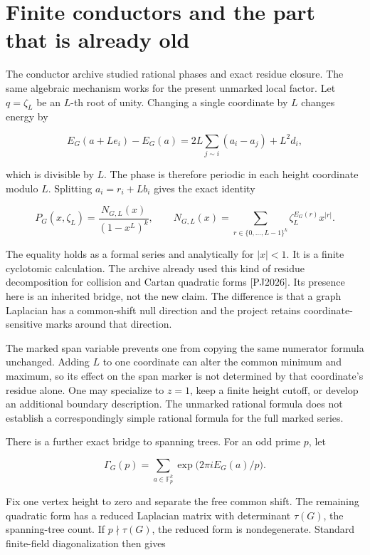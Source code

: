 \documentclass[
  11pt,
  a4paper,
]{report}
\begin{document}
\hypertarget{finite-conductors-and-the-part-that-is-already-old}{%
\section{Finite conductors and the part that is already
old}\label{finite-conductors-and-the-part-that-is-already-old}}

The conductor archive studied rational phases and exact residue closure.
The same algebraic mechanism works for the present unmarked local
factor. Let \(q=\zeta_L\) be an \(L\)-th root of unity. Changing a
single coordinate by \(L\) changes energy by

\[
E_G(a+Le_i)-E_G(a)
=2L\sum_{j\sim i}(a_i-a_j)+L^2d_i,
\]

which is divisible by \(L\). The phase is therefore periodic in each
height coordinate modulo \(L\). Splitting \(a_i=r_i+Lb_i\) gives the
exact identity

\[
P_G(x,\zeta_L)=\frac{N_{G,L}(x)}{(1-x^L)^k},
\qquad
N_{G,L}(x)=\sum_{r\in\{0,\ldots,L-1\}^k}
\zeta_L^{E_G(r)}x^{|r|}.
\tag{SNG-I021}
\]

The equality holds as a formal series and analytically for \(|x|<1\). It
is a finite cyclotomic calculation. The archive already used this kind
of residue decomposition for collision and Cartan quadratic forms
{[}PJ2026{]}. Its presence here is an inherited bridge, not the new
claim. The difference is that a graph Laplacian has a common-shift null
direction and the project retains coordinate-sensitive marks around that
direction.

The marked span variable prevents one from copying the same numerator
formula unchanged. Adding \(L\) to one coordinate can alter the common
minimum and maximum, so its effect on the span marker is not determined
by that coordinate's residue alone. One may specialize to \(z=1\), keep
a finite height cutoff, or develop an additional boundary description.
The unmarked rational formula does not establish a correspondingly
simple rational formula for the full marked series.

There is a further exact bridge to spanning trees. For an odd prime
\(p\), let

\[
\Gamma_G(p)=\sum_{a\in\mathbb F_p^k}
\exp\bigl(2\pi i E_G(a)/p\bigr).
\]

Fix one vertex height to zero and separate the free common shift. The
remaining quadratic form has a reduced Laplacian matrix with determinant
\(\tau(G)\), the spanning-tree count. If \(p\nmid\tau(G)\), the reduced
form is nondegenerate. Standard finite-field diagonalization then gives
\end{document}
